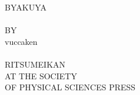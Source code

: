 \documentclass[uplatex,dvipdfmx]{vkaishi}
\begin{document}
\cleardoublepage
\thispagestyle{empty}

\begin{center} \ttfamily %
  {\fontsize{50}{0}\selectfont \rmfamily BYAKUYA}\\[3zw]
  {\fontsize{40}{0}\selectfont \rmfamily \vNumberingRoma}\\
  \vfill
  {\fontsize{16}{0}\selectfont BY}\\[0.5zw]
  {\fontsize{18}{0}\selectfont vuccaken}\\[8zw]
  {\fontsize{15}{0}\selectfont \vDate}\\[8zw]
  {\fontsize{15}{0}\selectfont RITSUMEIKAN}\\[4zw]
  {\fontsize{15}{0}\selectfont AT THE SOCIETY}\\[0.5zw]
  {\fontsize{15}{0}\selectfont OF PHYSICAL SCIENCES PRESS}
\end{center}
\end{document}
